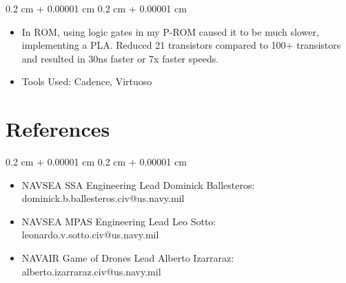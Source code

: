 \documentclass[10pt, letterpaper]{article}
\newenvironment{highlights}{
    \begin{itemize}[
        topsep=0.10 cm,
        parsep=0.10 cm,
        partopsep=0pt,
        itemsep=0pt,
        leftmargin=0.4 cm + 10pt
    ]
}{
    \end{itemize}
} %
\newenvironment{onecolentry}{
    \begin{adjustwidth}{
        0.2 cm + 0.00001 cm
    }{
        0.2 cm + 0.00001 cm
    }
}{
    \end{adjustwidth}
} %
\begin{document}
        \vspace{0.10 cm}
        \begin{onecolentry}
            \begin{highlights}
                \item In ROM, using logic gates in my P-ROM caused it to be much slower, implementing a PLA. Reduced 21 transistors compared to 100+ transistors and resulted in 30ns faster or 7x faster speeds.
                \item Tools Used: Cadence, Virtuoso
            \end{highlights}
        \end{onecolentry}


        \vspace{0.2 cm}

    \section{References}
        
        \begin{onecolentry}
            \begin{highlights}
                \item NAVSEA SSA Engineering Lead Dominick Ballesteros: dominick.b.ballesteros.civ@us.navy.mil
                \item NAVSEA MPAS Engineering Lead Leo Sotto: leonardo.v.sotto.civ@us.navy.mil
                \item NAVAIR Game of Drones Lead Alberto Izarraraz: alberto.izarraraz.civ@us.navy.mil
            \end{highlights}
        \end{onecolentry}
        \vspace{0.2 cm}
\end{document}

